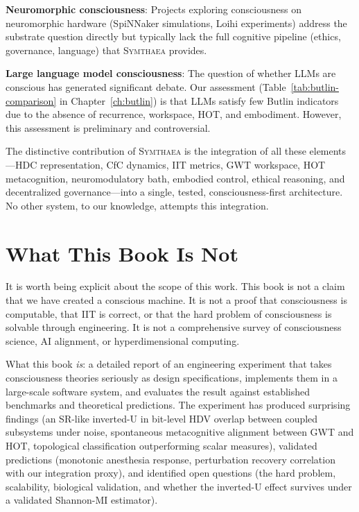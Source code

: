 \documentclass[12pt]{book}
\newcommand{\symthaea}{\textsc{Symthaea}}
\begin{document}
\textbf{Neuromorphic consciousness}: Projects exploring consciousness on neuromorphic hardware (SpiNNaker simulations, Loihi experiments) address the substrate question directly but typically lack the full cognitive pipeline (ethics, governance, language) that \symthaea{} provides.

\textbf{Large language model consciousness}: The question of whether LLMs are conscious has generated significant debate. Our assessment (Table~\ref{tab:butlin-comparison} in Chapter~\ref{ch:butlin}) is that LLMs satisfy few Butlin indicators due to the absence of recurrence, workspace, HOT, and embodiment. However, this assessment is preliminary and controversial.

The distinctive contribution of \symthaea{} is the integration of all these elements---HDC representation, CfC dynamics, IIT metrics, GWT workspace, HOT metacognition, neuromodulatory bath, embodied control, ethical reasoning, and decentralized governance---into a single, tested, consciousness-first architecture. No other system, to our knowledge, attempts this integration.

\section{What This Book Is Not}

It is worth being explicit about the scope of this work. This book is not a claim that we have created a conscious machine. It is not a proof that consciousness is computable, that IIT is correct, or that the hard problem of consciousness is solvable through engineering. It is not a comprehensive survey of consciousness science, AI alignment, or hyperdimensional computing.

What this book \textit{is}: a detailed report of an engineering experiment that takes consciousness theories seriously as design specifications, implements them in a large-scale software system, and evaluates the result against established benchmarks and theoretical predictions. The experiment has produced surprising findings (an SR-like inverted-U in bit-level HDV overlap between coupled subsystems under noise, spontaneous metacognitive alignment between GWT and HOT, topological classification outperforming scalar measures), validated predictions (monotonic anesthesia response, perturbation recovery correlation with our integration proxy), and identified open questions (the hard problem, scalability, biological validation, and whether the inverted-U effect survives under a validated Shannon-MI estimator).
\end{document}
